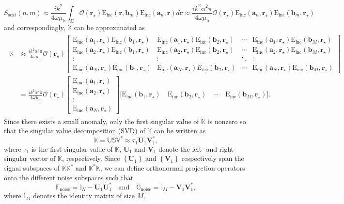 \documentclass[3p,10pt]{elsarticle}
\newcommand{\mub}{\mu_\mathrm{b}}
\newcommand{\set}[1]{\left\{#1\right\}}
\newcommand{\E}{\mathrm{E}}
\newcommand{\ma}{\mathbf{a}}
\newcommand{\mb}{\mathbf{b}}
\newcommand{\mr}{\mathbf{r}}
\newcommand{\mU}{\mathbf{U}}
\newcommand{\mV}{\mathbf{V}}
\DeclareMathOperator*{\inc}{inc}
\DeclareMathOperator*{\scat}{scat}
\DeclareMathOperator*{\noise}{noise}
\theoremstyle{plain}
\theoremstyle{remark}
\begin{document}
\begin{equation}\label{ScatteringParameter}
S_{\scat}(n,m)\approx\frac{ik^2}{4\omega\mub}\int_{\Sigma}\mathcal{O}(\mr_\star)\E_{\inc}(\mr,\mb_m)\E_{\inc}(\ma_n,\mr)d\mr\approx\frac{ik^2\alpha^2\pi}{4\omega\mub}\mathcal{O}(\mr_\star)\E_{\inc}(\ma_n,\mr_\star)\E_{\inc}(\mb_m,\mr_\star)
\end{equation}
and correspondingly, $\mathbb{K}$ can be approximated as
\begin{align}
\begin{aligned}\label{StructureMatrix}
\mathbb{K}&\approx\frac{ik^2\alpha^2\pi}{4\omega\mub}\mathcal{O}(\mr_\star)\begin{bmatrix}
\E_{\inc}(\ma_1,\mr_\star)\E_{\inc}(\mb_1,\mr_\star) & \E_{\inc}(\ma_1,\mr_\star)\E_{\inc}(\mb_2,\mr_\star) & \cdots & \E_{\inc}(\ma_1,\mr_\star)\E_{\inc}(\mb_M,\mr_\star) \\
\E_{\inc}(\ma_2,\mr_\star)\E_{\inc}(\mb_1,\mr_\star) & \E_{\inc}(\ma_2,\mr_\star)\E_{\inc}(\mb_2,\mr_\star) & \cdots & \E_{\inc}(\ma_2,\mr_\star)\E_{\inc}(\mb_M,\mr_\star) \\
\vdots & \vdots & \ddots & \vdots \\
\E_{\inc}(\ma_N,\mr_\star)\E_{\inc}(\mb_1,\mr_\star) & \E_{\inc}(\ma_N,\mr_\star)E_{\inc}(\mb_2,\mr_\star) & \cdots & \E_{\inc}(\ma_N,\mr_\star)\E_{\inc}(\mb_M,\mr_\star)
\end{bmatrix}\\
&=\frac{ik^2\alpha^2\pi}{4\omega\mub}\mathcal{O}(\mr_\star)
\begin{bmatrix}
\E_{\inc}(\ma_1,\mr_\star)\\
\E_{\inc}(\ma_2,\mr_\star)\\
\vdots\\
\E_{\inc}(\ma_N,\mr_\star)
\end{bmatrix}
\Big[\E_{\inc}(\mb_1,\mr_\star)\quad\E_{\inc}(\mb_2,\mr_\star)\quad\cdots\quad\E_{\inc}(\mb_M,\mr_\star)
\Big].
\end{aligned}
\end{align}
Since there exists a small anomaly, only the first singular value of $\mathbb{K}$ is nonzero so that the singular value decomposition (SVD) of $\mathbb{K}$ can be written as
\begin{equation}\label{SVD}
\mathbb{K}=\mathbb{USV}^*\approx\tau_1\mU_1\mV_1^*,
\end{equation}
where $\tau_1$ is the first singular value of $\mathbb{K}$, $\mU_1$ and $\mV_1$ denote the left- and right-singular vector of $\mathbb{K}$, respectively. Since $\set{\mU_1}$ and $\set{\mV_1}$ respectively span the signal subspaces of $\mathbb{KK}^*$ and $\mathbb{K}^*\mathbb{K}$, we can define orthonormal projection operators onto the different noise subspaces such that
\[\mathbb{F}_{\noise}=\mathbb{I}_N-\mU_1\mU_1^*\quad\text{and}\quad\mathbb{G}_{\noise}=\mathbb{I}_M-\mV_1\mV_1^*,\]
where $\mathbb{I}_M$ denotes the identity matrix of size $M$.
\end{document}

